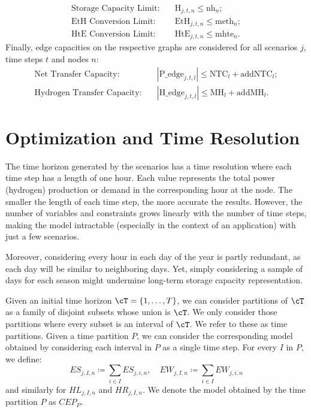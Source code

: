 \documentclass[english]{article}
\numberwithin{definition}{section}
\numberwithin{theorem}{section}
\numberwithin{problem}{section}
\begin{document}
\begin{align*}
    \text{Storage Capacity Limit:} \quad & \text{H}_{j,t,n} \leq \text{nh}_n ;\\
    \text{EtH Conversion Limit:} \quad & \text{EtH}_{j,t,n} \leq \text{meth}_n;\\
    \text{HtE Conversion Limit:} \quad & \text{HtE}_{j,t,n} \leq \text{mhte}_n .
\end{align*}
Finally, edge capacities on the respective graphs are considered for all scenarios \(j\), time steps \(t\) and nodes \(n\):
\begin{align*}
    \text{Net Transfer Capacity:} \quad & |\text{P\_edge}_{j,t,l}|\le\text{NTC}_l + \text{addNTC}_l ;\\
    \text{Hydrogen Transfer Capacity:} \quad & |\text{H\_edge}_{j,t,l}|\le\text{MH}_l + \text{addMH}_l.
\end{align*}

\section{Optimization and Time Resolution}\label{section:time-resolution}

The time horizon generated by the scenarios has a time resolution where each time step has a length of one hour. Each value represents the total power (hydrogen) production or demand in the corresponding hour at the node. The smaller the length of each time step, the more accurate the results. However, the number of variables and constraints grows linearly with the number of time steps, making the model intractable (especially in the context of an application) with just a few scenarios.

Moreover, considering every hour in each day of the year is partly redundant, as each day will be similar to neighboring days. Yet, simply considering a sample of days for each season might undermine long-term storage capacity representation. 

Given an initial time horizon \(\cT = \{1, \ldots, T\}\), we can consider partitions of \(\cT\) as a family of disjoint subsets whose union is \(\cT\). We only consider those partitions where every subset is an interval of \(\cT\). We refer to these as time partitions. Given a time partition \(P\), we can consider the corresponding model obtained by considering each interval in \(P\) as a single time step. For every \(I\) in \(P\), we define:
\[
ES_{j,I,n} \coloneqq \sum_{i \in I} ES_{j,i,n}, \quad EW_{j,I,n} \coloneqq \sum_{i \in I} EW_{j,i,n}
\]
and similarly for \(HL_{j,I,n}\) and \(HR_{j,I,n}\). We denote the model obtained by the time partition \(P\) as \(CEP_P\).
\end{document}

